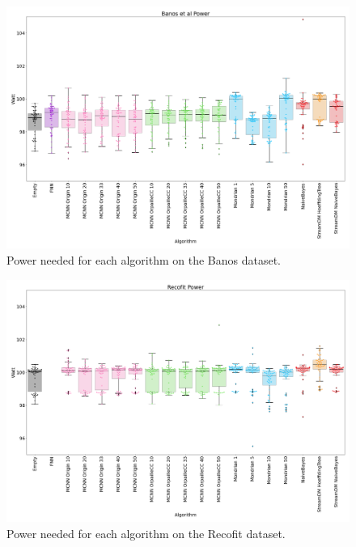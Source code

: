 \begin{figure}[H]
	\includegraphics[width=\linewidth]{figures/results/banos_watt.png}
	\caption{Power needed for each algorithm on the Banos dataset.}
	\label{fig:power-banos}
\end{figure}
\begin{figure}[H]
	\includegraphics[width=\linewidth]{figures/results/recofit_watt.png}
	\caption{Power needed for each algorithm on the Recofit dataset.}
	\label{fig:power-recofit}
\end{figure}
